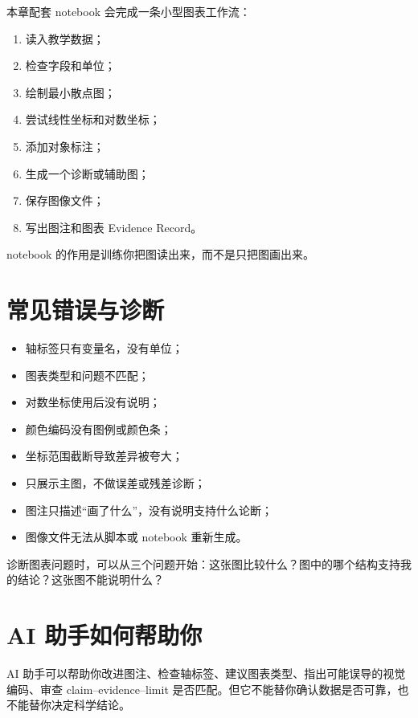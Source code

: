 本章配套 notebook 会完成一条小型图表工作流：

\begin{enumerate}
    \item 读入教学数据；
    \item 检查字段和单位；
    \item 绘制最小散点图；
    \item 尝试线性坐标和对数坐标；
    \item 添加对象标注；
    \item 生成一个诊断或辅助图；
    \item 保存图像文件；
    \item 写出图注和图表 Evidence Record。
\end{enumerate}

notebook 的作用是训练你把图读出来，而不是只把图画出来。

\section{常见错误与诊断}

\begin{warnbox}[科研图表中的典型问题]
\begin{itemize}
    \item 轴标签只有变量名，没有单位；
    \item 图表类型和问题不匹配；
    \item 对数坐标使用后没有说明；
    \item 颜色编码没有图例或颜色条；
    \item 坐标范围截断导致差异被夸大；
    \item 只展示主图，不做误差或残差诊断；
    \item 图注只描述“画了什么”，没有说明支持什么论断；
    \item 图像文件无法从脚本或 notebook 重新生成。
\end{itemize}
\end{warnbox}

诊断图表问题时，可以从三个问题开始：这张图比较什么？图中的哪个结构支持我的结论？这张图不能说明什么？

\section{AI 助手如何帮助你}

AI 助手可以帮助你改进图注、检查轴标签、建议图表类型、指出可能误导的视觉编码、审查 claim--evidence--limit 是否匹配。但它不能替你确认数据是否可靠，也不能替你决定科学结论。

